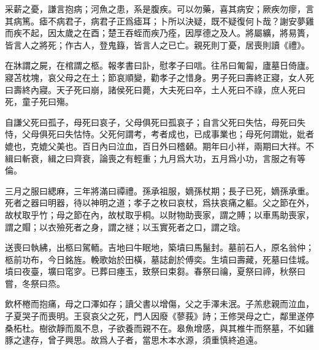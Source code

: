 \documentclass[12pt,a4paper]{ctexbook}
\begin{document}
采薪之憂，謙言抱病；河魚之患，系是腹疾。可以勿藥，喜其病安；厥疾勿瘳，言其病篤。瘧不病君子，病君子正爲瘧耳；卜所以決疑，既不疑復何卜哉？謝安夢雞而疾不起，因太歲之在酉；楚王吞蛭而疾乃痊，因厚德之及人。將屬纊，將易簣，皆言人之將死；作古人，登鬼籙，皆言人之已亡。親死則丁憂，居喪則讀《禮》。\par
在牀謂之屍，在棺謂之柩。報孝書曰訃，慰孝子曰唁。往吊曰匍匐，廬墓日倚廬。寢苫枕塊，哀父母之在土；節哀順變，勸孝子之惜身。男子死曰壽終正寢，女人死曰壽終內寢。天子死曰崩，諸侯死曰薨，大夫死曰卒，土人死曰不祿，庶人死曰死，童子死曰殤。\par
自謙父死曰孤子，母死曰哀子，父母俱死曰孤哀子；自言父死曰失怙，母死曰失恃，父母俱死曰失怙恃。父死何謂考，考者成也，已成事業也；母死何謂妣，妣者媲也，克媲父美也。百日內曰泣血，百日外曰稽顙。期年曰小祥，兩期曰大祥。不緝曰斬衰，緝之曰齊衰，論喪之有輕重；九月爲大功，五月爲小功，言服之有等倫。\par
三月之服曰緦麻，三年將滿曰禫禮。孫承祖服，嫡孫杖期；長子已死，嫡孫承重。死者之器曰明器，待以神明之道；孝子之枚曰哀杖，爲扶哀痛之軀。父之節在外，故杖取乎竹；母之節在內，故杖取乎桐。以財物助喪家，謂之賻；以車馬助喪家，謂之賵；以衣殮死者之身，謂之禭；以玉實死者之口，謂之琀。\par
送喪曰執紼，出柩曰駕輀。吉地曰牛眠地，築墳曰馬鬣封。墓前石人，原名翁仲；柩前功布，今日銘旌。輓歌始於田橫，墓誌創於傅奕。生墳曰壽藏，死墓曰佳城。墳曰夜臺，壙曰窀穸。已葬曰瘞玉，致祭曰束芻。春祭曰禴，夏祭曰禘，秋祭曰嘗，冬祭曰烝。\par
飲杯棬而抱痛，母之口澤如存；讀父書以增傷，父之手澤未泯。子羔悲親而泣血，子夏哭子而喪明。王裒哀父之死，門人因廢《蓼莪》詩；王修哭母之亡，鄰里遂停桑柘杜。樹欲靜而風不息，子欲養而親不在。皋魚增感，與其椎牛而祭墓，不如雞豚之逮存，曾子興思。故爲人子者，當思木本水源，須重慎終追遠。\par
\end{document}
